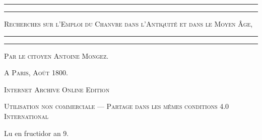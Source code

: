 \documentclass[a4paper, 11pt, oneside, polutonikogreek, french]{article}
\begin{document}
\begin{titlepage} %
	\centering %

	
	\rule{\textwidth}{1.6pt}\vspace*{-\baselineskip}\vspace*{2pt} %
	\rule{\textwidth}{0.4pt} %
	
	\vspace{1\baselineskip} %
	
	{\scshape\Huge Recherches sur l'Emploi du Chanvre dans l'Antiquité et dans le Moyen Âge,}
	
	\vspace{1\baselineskip} %

	\rule{\textwidth}{0.4pt}\vspace*{-\baselineskip}\vspace{3.2pt} %
	\rule{\textwidth}{1.6pt} %
	
	\vspace{1\baselineskip} %
	

 	\vspace*{1\baselineskip} %

	{\scshape \Large Par le citoyen Antoine Mongez.} %

 	\vspace*{1\baselineskip} %

\vspace*{\fill}

	\vspace{1\baselineskip}

	{\small\scshape A Paris, Août 1800.}
		
	\vspace{0.5\baselineskip} %

\scshape Internet Archive Online Edition%
	
	{\scshape\small Utilisation non commerciale --- Partage dans les mêmes conditions 4.0 International} %
\end{titlepage}
\setlength{\parskip}{1mm plus1mm minus1mm}
\clearpage
\begin{center}
Lu en fructidor an 9.
\end{center}
\end{document}
